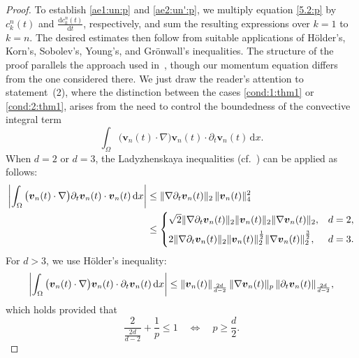 \documentclass[12pt,reqno]{amsart}
\numberwithin{equation}{section}
\let\originalleft\left
\let\originalright\right
\renewcommand{\left}{\mathopen{}\mathclose\bgroup\originalleft}
\renewcommand{\right}{\aftergroup\egroup\originalright}
\theoremstyle{definition}
\def\d{\mathrm{d}}
\def\vv{\boldsymbol{v}}
\begin{document}
\begin{proof}
To establish \eqref{ae1:un:p} and \eqref{ae2:un':p}, we multiply equation \eqref{5.2:p} by $c_k^n(t)$ and $\displaystyle \frac{\d c_k^n(t)}{\d t}$, respectively, and sum the resulting expressions over $k = 1$ to $k = n$.
The desired estimates then follow from suitable applications of H\"older's, Korn's, Sobolev's, Young's, and Gr\"onwall's inequalities.
The structure of the proof parallels the approach used in~\cite[Lemma~3.2]{Ant-Khom-2017}, though our momentum equation differs from the one considered there.
We just draw the reader's attention to statement~(2), where the distinction between the cases \eqref{cond:1:thm1} or \eqref{cond:2:thm1},
arises from the need to control the boundedness of the convective integral term
\begin{equation*}%
\int_{\Omega} \big( \vv_n(t) \cdot \nabla \big) \vv_n(t) \cdot \partial_t \vv_n(t) \, \mathrm{d}x .
\end{equation*}
When $d = 2$ or $d = 3$, the Ladyzhenskaya inequalities (cf.~\cite[Chapter~1, Lemmas~1 and 2]{Ladyzhenskaya1969}) can be applied as follows:
\begin{equation*}
\begin{split}
\left| \int_{\Omega} \big( \vv_n(t) \cdot \nabla \big) \partial_t \vv_n(t) \cdot \vv_n(t) \, \mathrm{d}x \right|
& \leq \|\nabla \partial_t \vv_n(t)\|_{2} \, \|\vv_n(t)\|_{4}^2 \\
& \leq
\begin{cases}
\sqrt{2}\|\nabla \partial_t \vv_n(t)\|_{2}\|\vv_n(t)\|_{2}\|\nabla \vv_n(t)\|_{2}, & d = 2, \\[4pt]
2\|\nabla \partial_t \vv_n(t)\|_{2}\|\vv_n(t)\|_{2}^{\frac{1}{2}}\|\nabla \vv_n(t)\|_{2}^{\frac{3}{2}}, & d = 3.
\end{cases}
\end{split}
\end{equation*}
For $d > 3$, we use H\"older's inequality:
\begin{equation*}
\left| \int_{\Omega} \big( \vv_n(t) \cdot \nabla \big) \vv_n(t) \cdot \partial_t \vv_n(t) \, \mathrm{d}x \right|
\leq \|\vv_n(t)\|_{\frac{2d}{d-2}} \, \|\nabla \vv_n(t)\|_{p} \, \|\partial_t \vv_n(t)\|_{\frac{2d}{d-2}},
\end{equation*}
which holds provided that
\begin{equation*}
\frac{2}{\frac{2d}{d-2}} + \frac{1}{p} \leq 1
\quad \Leftrightarrow \quad p \geq \frac{d}{2}.
\end{equation*}
\end{proof}
\end{document}

